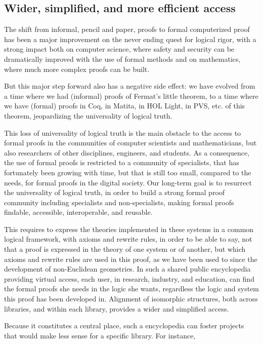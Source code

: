 \subsection{Wider, simplified, and more efficient access}

The shift from informal, pencil and paper, proofs to formal
computerized proof has been a major improvement on the never ending
quest for logical rigor, with a strong impact both on computer
science, where safety and security can be dramatically improved with
the use of formal methods and on mathematics, where much more complex
proofs can be built.

But this major step forward also has a negative side effect: we have
evolved from a time where we had (informal) proofs of Fermat's little
theorem, to a time where we have (formal) proofs in Coq, in Matita, in
HOL Light, in PVS, etc.  of this theorem, jeopardizing the
universality of logical truth.

This loss of universality of logical truth is the main obstacle to the
access to formal proofs in the communities of computer scientists and
mathematicians, but also researchers of other disciplines, engineers,
and students. As a consequence, the use of formal proofs is restricted
to a community of specialists, that has fortunately been growing with
time, but that is still too small, compared to the needs, for formal
proofs in the digital society.  Our long-term goal is to resurrect the
universality of logical truth, in order to build a strong formal proof
community including specialists and non-specialists, making
formal proofs findable, accessible, interoperable, and reusable.

This requires to express the theories implemented in these systems in
a common logical framework, with axioms and rewrite rules, in order to
be able to say, not that a proof is expressed in the theory of one
system or of another, but which axioms and rewrite rules are used in
this proof, as we have been used to since the development of
non-Euclidean geometries. In such a shared public encyclopedia
providing virtual access, each user, in research, industry, and
education, can find the formal proofs she needs in the logic she
wants, regardless the logic and system this proof has been developed
in.  Alignment of isomorphic structures, both across libraries, and
within each library, provides a wider and simplified access.

Because it constitutes a central place, such a encyclopedia can foster
projects that would make less sense for a specific library. For instance,

